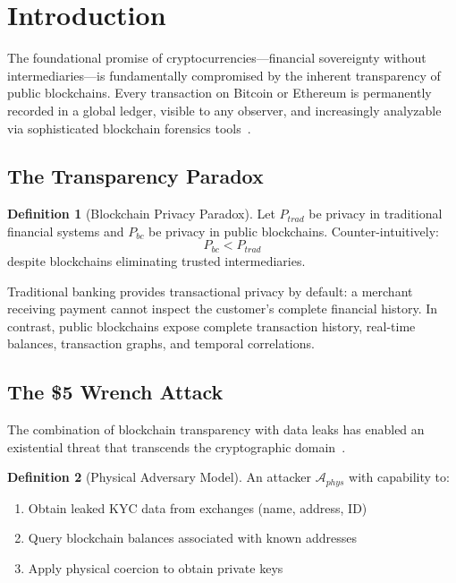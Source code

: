 \documentclass[11pt]{article}
\theoremstyle{definition}
\newtheorem{definition}{Definition}[section]
\theoremstyle{plain}
\theoremstyle{remark}
\begin{document}
\section{Introduction}
\label{sec:intro}

The foundational promise of cryptocurrencies---financial sovereignty without intermediaries---is fundamentally compromised by the inherent transparency of public blockchains. Every transaction on Bitcoin or Ethereum is permanently recorded in a global ledger, visible to any observer, and increasingly analyzable via sophisticated blockchain forensics tools~\cite{meiklejohn2013fistful, ron2013quantitative, harrigan2016unreasonable}.

\subsection{The Transparency Paradox}

\begin{definition}[Blockchain Privacy Paradox]
Let $P_{trad}$ be privacy in traditional financial systems and $P_{bc}$ be privacy in public blockchains. Counter-intuitively:
\begin{equation}
P_{bc} < P_{trad}
\end{equation}
despite blockchains eliminating trusted intermediaries.
\end{definition}

Traditional banking provides transactional privacy by default: a merchant receiving payment cannot inspect the customer's complete financial history. In contrast, public blockchains expose complete transaction history, real-time balances, transaction graphs, and temporal correlations.

\subsection{The \$5 Wrench Attack}

The combination of blockchain transparency with data leaks has enabled an existential threat that transcends the cryptographic domain~\cite{xkcd538}.

\begin{definition}[Physical Adversary Model]
An attacker $\mathcal{A}_{phys}$ with capability to:
\begin{enumerate}
    \item Obtain leaked KYC data from exchanges (name, address, ID)
    \item Query blockchain balances associated with known addresses
    \item Apply physical coercion to obtain private keys
\end{enumerate}
\end{definition}
\end{document}
